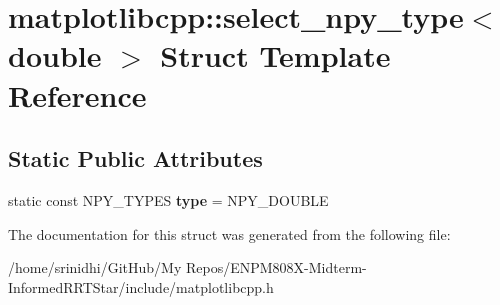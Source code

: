 \hypertarget{structmatplotlibcpp_1_1select__npy__type_3_01double_01_4}{}\section{matplotlibcpp\+:\+:select\+\_\+npy\+\_\+type$<$ double $>$ Struct Template Reference}
\label{structmatplotlibcpp_1_1select__npy__type_3_01double_01_4}
\subsection*{Static Public Attributes}
\begin{DoxyCompactItemize}
\item 
static const N\+P\+Y\+\_\+\+T\+Y\+P\+ES {\bfseries type} = N\+P\+Y\+\_\+\+D\+O\+U\+B\+LE\hypertarget{structmatplotlibcpp_1_1select__npy__type_3_01double_01_4_a939edaf81fedb879c8c90ad13c98a709}{}\label{structmatplotlibcpp_1_1select__npy__type_3_01double_01_4_a939edaf81fedb879c8c90ad13c98a709}

\end{DoxyCompactItemize}


The documentation for this struct was generated from the following file\+:\begin{DoxyCompactItemize}
\item 
/home/srinidhi/\+Git\+Hub/\+My Repos/\+E\+N\+P\+M808\+X-\/\+Midterm-\/\+Informed\+R\+R\+T\+Star/include/matplotlibcpp.\+h\end{DoxyCompactItemize}

